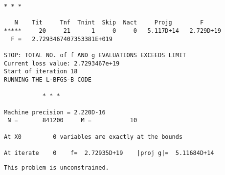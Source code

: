 \documentclass[11pt]{article}
\begin{document}
\begin{Verbatim}[commandchars=\\\{\}]
           * * *

   N    Tit     Tnf  Tnint  Skip  Nact     Projg        F
*****     20     21      1     0     0   5.117D+14   2.729D+19
  F =   2.7293467407353381E+019

STOP: TOTAL NO. of f AND g EVALUATIONS EXCEEDS LIMIT
Current loss value: 2.7293467e+19
Start of iteration 18
RUNNING THE L-BFGS-B CODE

           * * *

Machine precision = 2.220D-16
 N =       841200     M =           10

At X0         0 variables are exactly at the bounds

At iterate    0    f=  2.72935D+19    |proj g|=  5.11684D+14
    \end{Verbatim}

    \begin{Verbatim}[commandchars=\\\{\}]
 This problem is unconstrained.
    \end{Verbatim}
\end{document}
